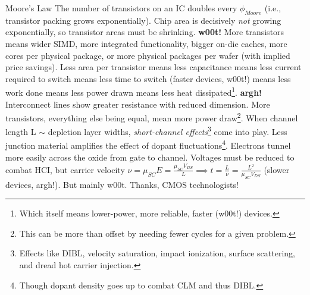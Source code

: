 \documentclass[mathserif,xcolor={dvipsnames,table}]{beamer}
\begin{document}
\begin{frame}{Moore's Law}
\scriptsize{The number of transistors on an IC doubles every $\phi_{Moore}$ (i.e.,
transistor packing grows exponentially). Chip area is decisively \textit{not}
growing exponentially, so transistor areas must be shrinking.}
\vfill
\scriptsize{\textbf{w00t!} More transistors means wider SIMD, more integrated functionality, bigger on-die
caches, more cores per physical package, or more physical packages per wafer (with implied
price savings). Less area per transistor means less capacitance means less current
required to switch means less time to switch (faster devices, w00t!) means less work
done means less power drawn means less heat dissipated\footnote{\tiny{Which itself means lower-power, more reliable, faster (w00t!) devices.}}.}
\vfill
\scriptsize{\textbf{argh!} Interconnect lines show greater resistance with reduced dimension. More
transistors, everything else being equal, mean more power draw\footnote{\tiny{This can be more than offset by needing fewer cycles for a given problem.}}. When
channel length L $\sim$ depletion layer widths, \textit{short-channel effects}\footnote{\tiny{Effects like DIBL,
velocity saturation, impact ionization, surface scattering,
and dread hot carrier injection.}} come into play. Less junction material amplifies
the effect of dopant fluctuations\footnote{\tiny{Though dopant density goes up to combat
CLM and thus DIBL.}}. Electrons tunnel more easily across the oxide
from gate to channel. Voltages must be reduced to combat HCI, but carrier velocity
$\nu = \mu_{SC}E = \frac{\mu_{SC}V_{DS}}{L} \implies t = \frac{L}{\nu} = \frac{L^{2}}{\mu_{SC}V_{DS}}$ (slower devices, argh!).}
\vfill
\scriptsize{But mainly w00t. Thanks, CMOS technologists!}
\end{frame}
\end{document}
